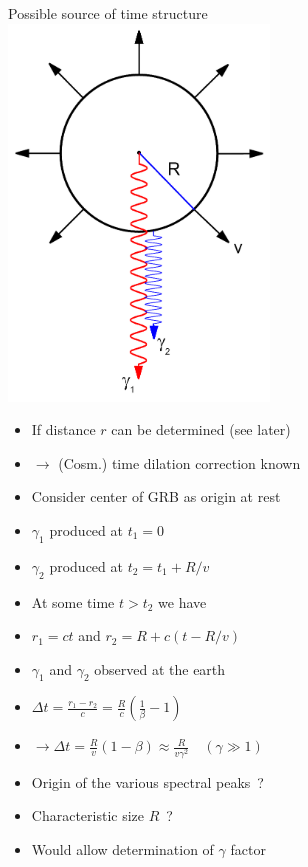 \Tr
{}%
\begin{center}
{\red Possible source of time structure}\\[5mm]
\includegraphics[keepaspectratio,height=10cm]{grb-shell3}
\end{center}
%
\begin{itemize}
\item If distance $r$ can be determined (see later)
\item[] $\rightarrow$ (Cosm.) time dilation correction known
\end{itemize}

\newpage

\begin{itemize}
\item Consider center of GRB as origin at rest
\item[] $\gamma_{1}$ produced at $t_{1}=0$
\item[] $\gamma_{2}$ produced at $t_{2}=t_{1}+R/v$
\item[] At some time $t>t_{2}$ we have
\item[] $r_{1}=ct$ and $r_{2}=R+c(t-R/v)$
\item $\gamma_{1}$ and $\gamma_{2}$ observed at the earth
\item[] $\displaystyle \Delta t=\frac{r_{1}-r_{2}}{c}=\frac{R}{c}\left(\frac{1}{\beta}-1\right)$
\item[] $\displaystyle \rightarrow \Delta t=\frac{R}{v}(1-\beta)
          \approx \frac{R}{v \gamma^{2}} \quad (\gamma \gg 1)$
\item[] {\blue Origin of the various spectral peaks~?}
\item Characteristic size $R$~?
\item[] Would allow determination of $\gamma$ factor
\end{itemize}

